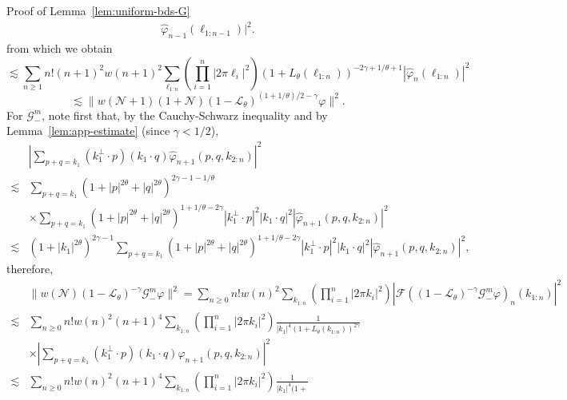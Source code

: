 \documentclass{article}
\newenvironment{proof*}[1]{\noindent\textbf{#1\ }}{\hspace*{\fill}$\Box$\medskip}
\begin{document}
\begin{proof*}{Proof of Lemma~\ref{lem:uniform-bds-G}}
\[\begin{array}{ll}
       \hat{\varphi}_{n - 1} (\ell_{1 : n - 1}) |^2 .
     \end{array} \]
  from which we obtain
  \[ \lesssim \sum_{n \geqslant 1} n! (n + 1)^2 w (n + 1)^2 \sum_{\ell_{1 :
     n}} \left( \prod_{i = 1}^n | 2 \pi \ell_i |^2 \right) (1 + L_{\theta}
     (\ell_{1 : n}))^{- 2 \gamma + 1 / \theta + 1} | \hat{\varphi}_n (\ell_{1
     : n}) |^2 \]
  \[ \lesssim \| w (\mathcal{N}+ 1) (1 +\mathcal{N}) (1
     -\mathcal{L}_{\theta})^{(1 + 1 / \theta) / 2 - \gamma} \varphi \|^2 . \]
  For $\mathcal{G}_-^m$, note first that, by the Cauchy-Schwarz inequality and
  by Lemma~\ref{lem:app-estimate} (since $\gamma < 1 / 2$),
  \[ \begin{array}{ll}
       & \left| \sum_{p + q = k_1} (k_1^{\perp} \cdot p)  (k_1 \cdot q)
       \hat{\varphi}_{n + 1} (p, q, k_{2 : n}) \right|^2\\
       \lesssim & \sum_{p + q = k_1} (1 + | p |^{2 \theta} + | q |^{2
       \theta})^{2 \gamma - 1 - 1 / \theta}\\
       & \times \sum_{p + q = k_1} (1 + | p |^{2 \theta} + | q |^{2
       \theta})^{1 + 1 / \theta - 2 \gamma} | k_1^{\perp} \cdot p |^2  | k_1
       \cdot q |^2 | \hat{\varphi}_{n + 1} (p, q, k_{2 : n}) |^2\\
       \lesssim & (1 + | k_1 |^{2 \theta})^{2 \gamma - 1} \sum_{p + q = k_1}
       (1 + | p |^{2 \theta} + | q |^{2 \theta})^{1 + 1 / \theta - 2 \gamma} |
       k_1^{\perp} \cdot p |^2  | k_1 \cdot q |^2 | \hat{\varphi}_{n + 1} (p,
       q, k_{2 : n}) |^2,
     \end{array} \]
  therefore,
  \[ \begin{array}{ll}
       & \| w (\mathcal{N}) (1 -\mathcal{L}_{\theta})^{- \gamma}
       \mathcal{G}_-^m \varphi \|^2 = \sum_{n \geqslant 0} n! w (n)^2
       \sum_{k_{1 : n}} \left( \prod_{i = 1}^n | 2 \pi k_i |^2 \right) |
       \mathcal{F} ((1 -\mathcal{L}_{\theta})^{- \gamma} \mathcal{G}_-^m
       \varphi)_n (k_{1 : n}) |^2\\
       \lesssim & \sum_{n \geqslant 0} n! w (n)^2 (n + 1)^4 \sum_{k_{1 : n}}
       \left( \prod_{i = 1}^n | 2 \pi k_i |^2 \right) \frac{1}{| k_1 |^4 (1 +
       L_{\theta} (k_{1 : n}))^{2 \gamma}}\\
       & \times \left| \sum_{p + q = k_1} (k_1^{\perp} \cdot p)  (k_1 \cdot
       q) \hat{\varphi}_{n + 1} (p, q, k_{2 : n}) \right|^2\\
       \lesssim & \sum_{n \geqslant 0} n! w (n)^2 (n + 1)^4 \sum_{k_{1 : n}}
       \left( \prod_{i = 1}^n | 2 \pi k_i |^2 \right) \frac{1}{| k_1 |^4 (1 +
}
\end{array}\]
\end{proof*}
\end{document}
